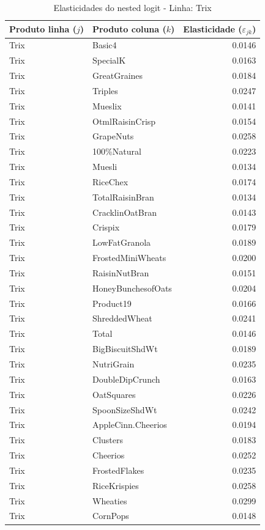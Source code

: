 \begingroup
\begin{table}[H]
\centering
\caption{Elasticidades do nested logit - Linha: Trix}
\label{tab:elas-nested-trix}
\small
\begin{tabular}{llr}
\toprule
Produto linha ($j$) & Produto coluna ($k$) & Elasticidade ($\varepsilon_{jk}$) \\
\midrule
Trix & Basic4 & 0.0146 \\
Trix & SpecialK & 0.0163 \\
Trix & GreatGraines & 0.0184 \\
Trix & Triples & 0.0247 \\
Trix & Mueslix & 0.0141 \\
Trix & OtmlRaisinCrisp & 0.0154 \\
Trix & GrapeNuts & 0.0258 \\
Trix & 100\%Natural & 0.0223 \\
Trix & Muesli & 0.0134 \\
Trix & RiceChex & 0.0174 \\
Trix & TotalRaisinBran & 0.0134 \\
Trix & CracklinOatBran & 0.0143 \\
Trix & Crispix & 0.0179 \\
Trix & LowFatGranola & 0.0189 \\
Trix & FrostedMiniWheats & 0.0200 \\
Trix & RaisinNutBran & 0.0151 \\
Trix & HoneyBunchesofOats & 0.0204 \\
Trix & Product19 & 0.0166 \\
Trix & ShreddedWheat & 0.0241 \\
Trix & Total & 0.0146 \\
Trix & BigBiscuitShdWt & 0.0189 \\
Trix & NutriGrain & 0.0235 \\
Trix & DoubleDipCrunch & 0.0163 \\
Trix & OatSquares & 0.0226 \\
Trix & SpoonSizeShdWt & 0.0242 \\
Trix & AppleCinn.Cheerios & 0.0194 \\
Trix & Clusters & 0.0183 \\
Trix & Cheerios & 0.0252 \\
Trix & FrostedFlakes & 0.0235 \\
Trix & RiceKrispies & 0.0258 \\
Trix & Wheaties & 0.0299 \\
Trix & CornPops & 0.0148 \\

\end{tabular}
\end{table}
